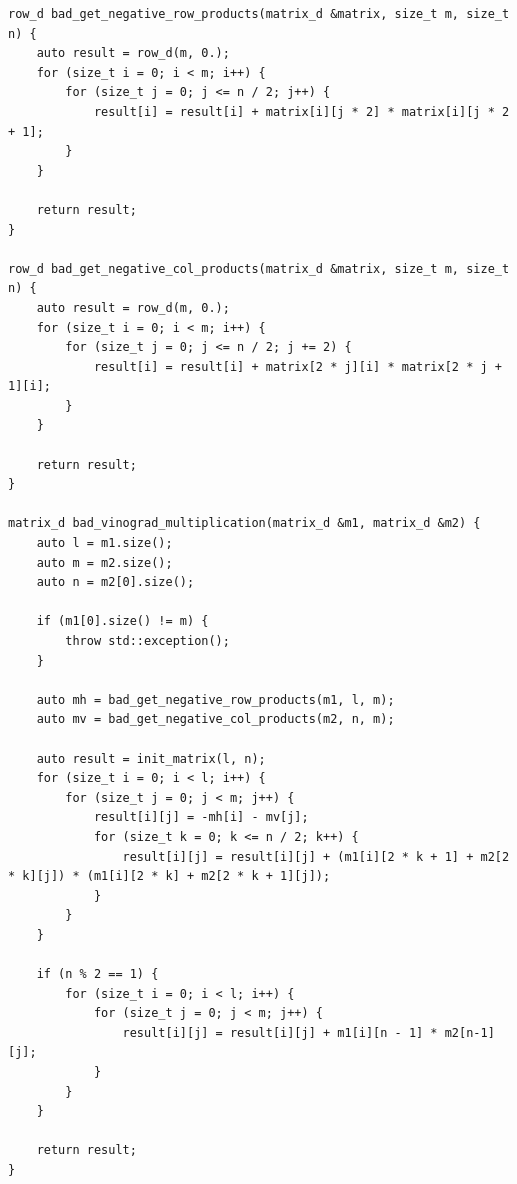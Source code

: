 \documentclass[a4paper,12pt]{article}
\begin{document}
            	\begin{lstlisting}[frame=single,caption=Алгоритм винограда, breaklines]
row_d bad_get_negative_row_products(matrix_d &matrix, size_t m, size_t n) {
    auto result = row_d(m, 0.);
    for (size_t i = 0; i < m; i++) {
        for (size_t j = 0; j <= n / 2; j++) {
            result[i] = result[i] + matrix[i][j * 2] * matrix[i][j * 2 + 1];
        }
    }

    return result;
}

row_d bad_get_negative_col_products(matrix_d &matrix, size_t m, size_t n) {
    auto result = row_d(m, 0.);
    for (size_t i = 0; i < m; i++) {
        for (size_t j = 0; j <= n / 2; j += 2) {
            result[i] = result[i] + matrix[2 * j][i] * matrix[2 * j + 1][i];
        }
    }

    return result;
}

matrix_d bad_vinograd_multiplication(matrix_d &m1, matrix_d &m2) {
    auto l = m1.size();
    auto m = m2.size();
    auto n = m2[0].size();

    if (m1[0].size() != m) {
        throw std::exception();
    }

    auto mh = bad_get_negative_row_products(m1, l, m);
    auto mv = bad_get_negative_col_products(m2, n, m);

    auto result = init_matrix(l, n);
    for (size_t i = 0; i < l; i++) {
        for (size_t j = 0; j < m; j++) {
            result[i][j] = -mh[i] - mv[j];
            for (size_t k = 0; k <= n / 2; k++) {
                result[i][j] = result[i][j] + (m1[i][2 * k + 1] + m2[2 * k][j]) * (m1[i][2 * k] + m2[2 * k + 1][j]);
            }
        }
    }

    if (n % 2 == 1) {
        for (size_t i = 0; i < l; i++) {
            for (size_t j = 0; j < m; j++) {
                result[i][j] = result[i][j] + m1[i][n - 1] * m2[n-1][j];
            }
        }
    }

    return result;
}
   				 \end{lstlisting}
    \newpage
\end{document}

